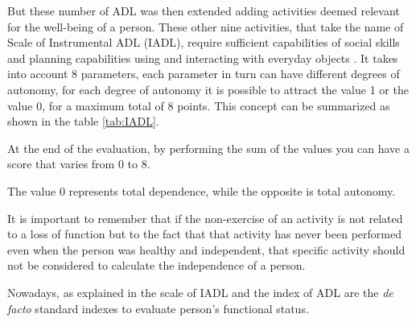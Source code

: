 \documentclass{thesisreport}
\begin{document}
But these number of ADL was then extended adding activities deemed relevant for the well-being of a person. These other nine activities, that take the name of Scale of Instrumental ADL \cite{lawton1970assessment} (IADL), require sufficient capabilities of social skills and planning capabilities using and interacting with everyday objects \cite{buoncompagni2017towards}. 
It takes into account 8 parameters, each parameter in turn can have different degrees of autonomy, for each degree of autonomy it is possible to attract the value 1 or the value 0, for a maximum total of 8 points. This concept can be summarized as shown in the table \ref{tab:IADL}. 



At the end of the evaluation, by performing the sum of the values you can have a score that varies from 0 to 8.

The value 0 represents total dependence, while the opposite is total autonomy.

It is important to remember that if the non-exercise of an activity is not related to a loss of function but to the fact that that activity has never been performed even when the person was healthy and independent, that specific activity should not be considered to calculate the independence of a person.


Nowadays, as explained in \cite{bruno2014public} the scale of IADL and the index of ADL are the \textit{de facto} standard indexes to evaluate person’s functional status\cite{buoncompagni2017towards}. 
\end{document}
